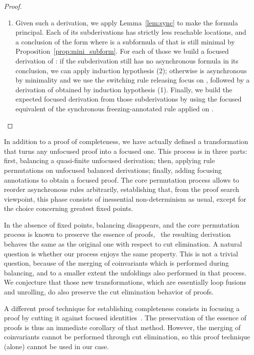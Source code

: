 \begin{proof}
\begin{enumerate}
\item
Given such a derivation,
we apply Lemma~\ref{lem:sync} to make the formula  principal.
Each of its subderivations has strictly less reachable locations,
and a conclusion of the form 
where  is a subformula of 
that is still minimal by Proposition~\ref{prop:mini_subform}.
For each of those we build a focused derivation of
:
if the subderivation still has no asynchronous formula in its conclusion,
we can apply induction hypothesis (2);
otherwise  is asynchronous by minimality
and we use the switching rule releasing focus on ,
followed by a derivation of 
obtained by induction hypothesis (1).
Finally, we build the expected focused derivation from those
subderivations by using the focused equivalent of the
synchronous freezing-annotated rule applied on .
\end{enumerate}
\vspace{-0.6cm}\end{proof}

In addition to a proof of completeness, we have actually defined
a transformation that turns any unfocused proof into a focused one.
This process is in three parts:
first, balancing a quasi-finite unfocused derivation;
then, applying rule permutations on unfocused balanced derivations;
finally, adding focusing annotations to obtain a focused proof.
The core permutation process allows to reorder asynchronous rules
arbitrarily, establishing that, from the proof search viewpoint,
this phase consists of inessential non-determinism as usual,
except for the choice concerning greatest fixed points.

In the absence of fixed points, balancing disappears,
and the core permutation process is known to preserve the essence of
proofs, \ie\ the resulting derivation behaves the same as the original
one with respect to cut elimination.
A natural question is whether our process enjoys the same property.
This is not a trivial question,
because of the merging of coinvariants which is performed during balancing,
and to a smaller extent the unfoldings also performed in that process.
We conjecture that those new transformations, which are essentially
loop fusions and unrolling, do also preserve the
cut elimination behavior of proofs.

A different proof technique for establishing completeness
consists in focusing a proof by cutting it against focused 
identities~\cite{laurent04unp,chaudhuri08jar}.
The preservation of the essence of proofs is thus an immediate
corollary of that method.
However, the merging of coinvariants cannot be performed through
cut elimination, so this proof technique (alone) cannot be used
in our case.



